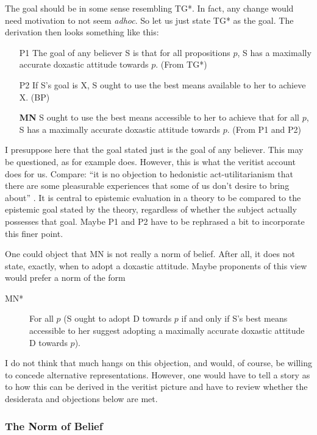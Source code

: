 \documentclass[12pt,numbers=noenddot]{scrartcl}
\begin{document}
The goal should be in some sense resembling TG*. In fact, any change would need motivation to not seem \emph{adhoc}. So let us just state TG* as the goal. The derivation then looks something like this:

\begin{enumerate}
    \item[P1] The goal of any believer S is that for all propositions $p$, S has a maximally accurate doxastic attitude towards $p$. (From TG*)
    \item[P2] If S's goal is X, S ought to use the best means available to her to achieve X. (BP)
    \item[\textbf{MN}] S ought to use the best means accessible to her to achieve that for all $p$, S has a maximally accurate doxastic attitude towards $p$. (From P1 and P2)
\end{enumerate}

I presuppose here that the goal stated just is the goal of any believer. This may be questioned, as for example \textcite{Kelly2003-KELERA} does. However, this is what the veritist account does for us. Compare: “it is no objection to hedonistic act-utilitarianism that there are some pleasurable experiences that some of us don’t desire to bring about” \autocite[362]{Berker2013-BERETA-2}. It is central to epistemic evaluation in a theory to be compared to the epistemic goal stated by the theory, regardless of whether the subject actually possesses that goal. Maybe P1 and P2 have to be rephrased a bit to incorporate this finer point.

One could object that MN is not really a norm of belief. After all, it does not state, exactly, when to adopt a doxastic attitude. Maybe proponents of this view would prefer a norm of the form
\begin{description}
    \item[MN*] For all $p$ (S ought to adopt D towards $p$ if and only if S's best means accessible to her suggest adopting a maximally accurate doxastic attitude D towards $p$).
\end{description}
I do not think that much hangs on this objection, and would, of course, be willing to concede alternative representations. However, one would have to tell a story as to how this can be derived in the veritist picture and have to review whether the desiderata and objections below are met.

\subsubsection{The Norm of Belief}
\end{document}
